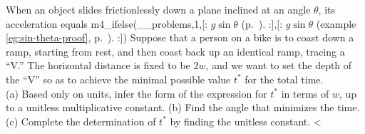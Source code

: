 When an object slides frictionlessly down a plane inclined at an angle
$\theta$, its acceleration equals 
m4_ifelse(__problems,1,[:%
$g\sin\theta$ (p.~\pageref{inclined-plane}).
:],[:%
$g\sin\theta$ (example \ref{eg:sin-theta-proof}, p.~\pageref{eg:sin-theta-proof}).
:])%
Suppose that a person on a bike is to coast down a ramp, starting from
rest, and then coast back up an identical ramp, tracing a ``V.'' The
horizontal distance is fixed to be $2w$, and we want to set the depth of the ``V'' so as to
achieve the minimal possible value $t^*$ for the total time.\\
(a) Based only on units, infer the form of the expression for $t^*$ in terms
of $w$, up to a unitless multiplicative constant.\hwendpart
(b) Find the angle that minimizes the time.\hwendpart
(c) Complete the determination of $t^*$ by finding the unitless constant.
<%
